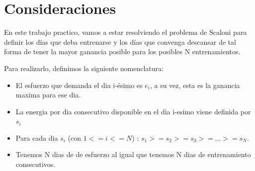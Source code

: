 \section{Consideraciones}

En este trabajo practico, vamos a estar resolviendo el problema de Scaloni para  definir los días que deba entrenarse y los días que convenga descansar de tal forma de tener la mayor ganancia posible para los posibles N entrenamientos.


Para realizarlo, definimos la siguiente nomenclatura: 

\begin{itemize}
    \item El esfuerzo que demanda el dia i-ésimo es $e_i$, a su vez, esta es la ganancia maxima para ese dia.
    \item La energia por dia consecutivo disponible en el dia i-esimo viene definida por $s_i$
    \item Para cada dia $s_i$ (con $1 <= i <= N$) : $s_1 >= s_2 >= s_3 >= ... >= s_N$. 
    \item Tenemos N dias de de esfuerzo al igual que tenemos N dias de entrenamiento consecutivos.
\end{itemize}